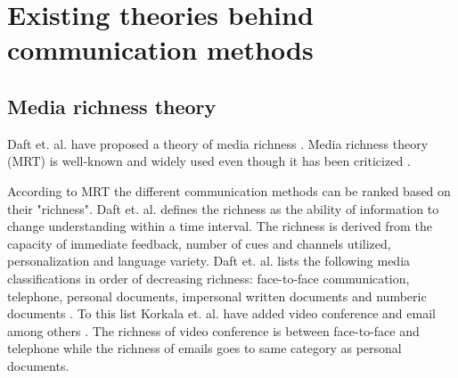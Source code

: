 \documentclass[conference]{IEEEtran}
\begin{document}
\begin{comment}

\subsection{Video conference and telephone}

\subsection{Email}

\subsection{Chat rooms}

\textbf{TODO: Synchronous vs. asynchonous methods, Email, Video conference, documents etc.}

\section{Communication and feedback methods in software projects}

\end{comment}

\section{Existing theories behind communication methods}

\subsection{Media richness theory}

Daft et. al. have proposed a theory of media richness \cite{1986daft}. Media richness theory (MRT) is well-known and widely used even though it has been criticized \cite{2006korkala} \cite{1999dennis}. 

According to MRT the different communication methods can be ranked based on their "richness". Daft et. al. defines the richness as the ability of information to change understanding within a time interval. The richness is derived from the capacity of immediate feedback, number of cues and channels utilized, personalization and language variety. Daft et. al. lists the following media classifications in order of decreasing richness: face-to-face communication, telephone, personal documents, impersonal written documents and numberic documents \cite{1986daft}. To this list Korkala et. al. have added video conference and email among others \cite{2006korkala}. The richness of video conference is between face-to-face and telephone while the richness of emails goes to same category as personal documents.
\end{document}
